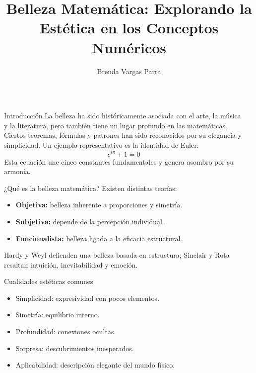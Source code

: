 \documentclass[final]{beamer}
\title{Belleza Matemática: Explorando la Estética en los Conceptos Numéricos}
\author{Brenda Vargas Parra}
\institute{Universidad XYZ}
\begin{document}
\begin{frame}[t]

\begin{columns}[t]

\begin{column}{0.48\textwidth}

\begin{block}{Introducción}
La belleza ha sido históricamente asociada con el arte, la música y la literatura, pero también tiene un lugar profundo en las matemáticas. Ciertos teoremas, fórmulas y patrones han sido reconocidos por su elegancia y simplicidad. Un ejemplo representativo es la identidad de Euler:
\[
e^{i\pi} + 1 = 0
\]
Esta ecuación une cinco constantes fundamentales y genera asombro por su armonía.
\end{block}

\begin{block}{¿Qué es la belleza matemática?}
Existen distintas teorías:
\begin{itemize}
    \item \textbf{Objetiva:} belleza inherente a proporciones y simetría.
    \item \textbf{Subjetiva:} depende de la percepción individual.
    \item \textbf{Funcionalista:} belleza ligada a la eficacia estructural.
\end{itemize}
Hardy y Weyl defienden una belleza basada en estructura; Sinclair y Rota resaltan intuición, inevitabilidad y emoción.
\end{block}

\begin{block}{Cualidades estéticas comunes}
\begin{itemize}
    \item Simplicidad: expresividad con pocos elementos.
    \item Simetría: equilibrio interno.
    \item Profundidad: conexiones ocultas.
    \item Sorpresa: descubrimientos inesperados.
    \item Aplicabilidad: descripción elegante del mundo físico.
\end{itemize}
\end{block}

\end{column}

\begin{column}{0.48\textwidth}


\end{column}
\end{columns}
\end{frame}
\end{document}
